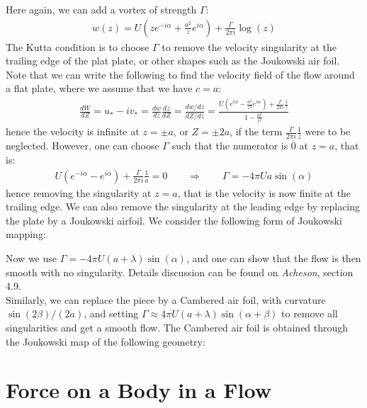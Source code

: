 \documentclass[11pt]{book}
\theoremstyle{break}
\theoremstyle{break}
\begin{document}
Here again, we can add a vortex of strength $\Gamma$:
\begin{align*}
w(z) = U \left( ze^{-i\alpha} + \frac{a^2}{z}e^{i\alpha}\right) + \frac{\Gamma}{2\pi i}\log(z)
\end{align*}
The Kutta condition is to choose $\Gamma$ to remove the velocity singularity at the trailing edge of the plat plate, or other shapes such as the Joukowski air foil. Note that we can write the following to find the velocity field of the flow around a flat plate, where we assume that we have $c=a$:
\begin{align*}
\frac{dW}{dZ} = u_* - iv_* = \frac{dw}{dz}\frac{dz}{dZ} = \frac{dw/dz}{dZ/dz} = \frac{U\left( e^{i\alpha} - \frac{a^2}{z^2}e^{i\alpha}\right) +\frac{\Gamma}{2\pi i}\frac{1}{z}}{1-\frac{a^2}{z^2}}
\end{align*}
hence the velocity is infinite at $z = \pm a$, or $Z = \pm 2a$, if the term $\frac{\Gamma}{2\pi i}\frac{1}{z}$ were to be neglected. However, one can choose $\Gamma$ such that the numerator is $0$ at $z = a$, that is:
\begin{align*}
U(e^{-i\alpha} - e^{i\alpha}) + \frac{\Gamma}{2\pi i}\frac{1}{a} = 0 \qquad \Rightarrow \qquad \Gamma = -4\pi Ua \sin(\alpha)
\end{align*}
hence removing the singularity at $z=a$, that is the velocity is now finite at the trailing edge. We can also remove the singularity at the leading edge by replacing the plate by a Joukowski airfoil. We consider the following form of Joukowski mapping:
\begin{center}

\end{center}
Now we use $\Gamma = -4\pi U(a+\lambda)\sin(\alpha)$, and one can show that the flow is then smooth with no singularity. Details discussion can be found on \textit{Acheson}, section 4.9.\\


Similarly, we can replace the piece by a Cambered air foil, with curvature $\sin(2\beta)/(2a)$, and setting $\Gamma \approx 4\pi U(a+\lambda) \sin(\alpha+\beta)$ to remove all singularities and get a smooth flow. The Cambered air foil is obtained through the Joukowski map of the following geometry:


\newpage
\section[Force on a Body in a Flow]{\color{red}Force on a Body in a Flow\color{black}}
\end{document}

